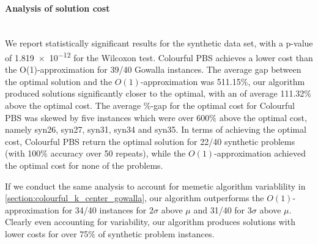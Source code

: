 

\paragraph{Analysis of solution cost}~\\
We report statistically significant results for the synthetic data set, with a p-value of \num{1.819e-12} for the Wilcoxon test. Colourful PBS achieves a lower cost than the O(1)-approximation for 39/40 Gowalla instances. The average gap between the optimal solution and the $O(1)$-approximation was 511.15\%, our algorithm produced solutions significantly closer to the optimal, with an of average 111.32\% above the optimal cost. The average \%-gap for the optimal cost for Colourful PBS was skewed by five instances which were over 600\% above the optimal cost, namely syn26, syn27, syn31, syn34 and syn35. In terms of achieving the optimal cost, Colourful PBS return the optimal solution for 22/40 synthetic problems (with 100\% accuracy over 50 repeats), while the $O(1)$-approximation achieved the optimal cost for none of the problems.

If we conduct the same analysis to account for memetic algorithm variablility in \cref{section:colourful_k_center_gowalla}, our algorithm outperforms the $O(1)$-approximation for 34/40 instances for $2\sigma$ above $\mu$ and 31/40 for $3\sigma$ above $\mu$. Clearly even accounting for variability, our algorithm produces solutions with lower costs for over 75\% of synthetic problem instances.